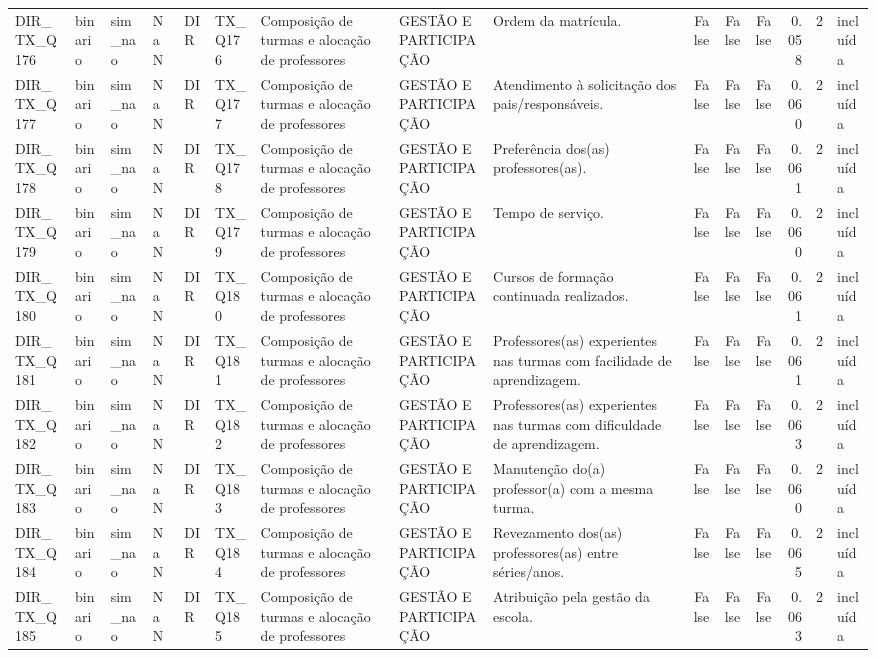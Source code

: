\begin{tabular}{lllllllllrrrrrl}
DIR\_TX\_Q176 & binario & sim\_nao & NaN & DIR & TX\_Q176 & Composição de turmas e alocação de professores & GESTÃO E PARTICIPAÇÃO & Ordem da matrícula. & False & False & False & 0.058 & 2 & incluída \\
DIR\_TX\_Q177 & binario & sim\_nao & NaN & DIR & TX\_Q177 & Composição de turmas e alocação de professores & GESTÃO E PARTICIPAÇÃO & Atendimento à solicitação dos pais/responsáveis. & False & False & False & 0.060 & 2 & incluída \\
DIR\_TX\_Q178 & binario & sim\_nao & NaN & DIR & TX\_Q178 & Composição de turmas e alocação de professores & GESTÃO E PARTICIPAÇÃO & Preferência dos(as) professores(as). & False & False & False & 0.061 & 2 & incluída \\
DIR\_TX\_Q179 & binario & sim\_nao & NaN & DIR & TX\_Q179 & Composição de turmas e alocação de professores & GESTÃO E PARTICIPAÇÃO & Tempo de serviço. & False & False & False & 0.060 & 2 & incluída \\
DIR\_TX\_Q180 & binario & sim\_nao & NaN & DIR & TX\_Q180 & Composição de turmas e alocação de professores & GESTÃO E PARTICIPAÇÃO & Cursos de formação continuada realizados. & False & False & False & 0.061 & 2 & incluída \\
DIR\_TX\_Q181 & binario & sim\_nao & NaN & DIR & TX\_Q181 & Composição de turmas e alocação de professores & GESTÃO E PARTICIPAÇÃO & Professores(as) experientes nas turmas com facilidade de aprendizagem. & False & False & False & 0.061 & 2 & incluída \\
DIR\_TX\_Q182 & binario & sim\_nao & NaN & DIR & TX\_Q182 & Composição de turmas e alocação de professores & GESTÃO E PARTICIPAÇÃO & Professores(as) experientes nas turmas com dificuldade de aprendizagem. & False & False & False & 0.063 & 2 & incluída \\
DIR\_TX\_Q183 & binario & sim\_nao & NaN & DIR & TX\_Q183 & Composição de turmas e alocação de professores & GESTÃO E PARTICIPAÇÃO & Manutenção do(a) professor(a) com a mesma turma. & False & False & False & 0.060 & 2 & incluída \\
DIR\_TX\_Q184 & binario & sim\_nao & NaN & DIR & TX\_Q184 & Composição de turmas e alocação de professores & GESTÃO E PARTICIPAÇÃO & Revezamento dos(as) professores(as) entre séries/anos. & False & False & False & 0.065 & 2 & incluída \\
DIR\_TX\_Q185 & binario & sim\_nao & NaN & DIR & TX\_Q185 & Composição de turmas e alocação de professores & GESTÃO E PARTICIPAÇÃO & Atribuição pela gestão da escola. & False & False & False & 0.063 & 2 & incluída \\

\end{tabular}
